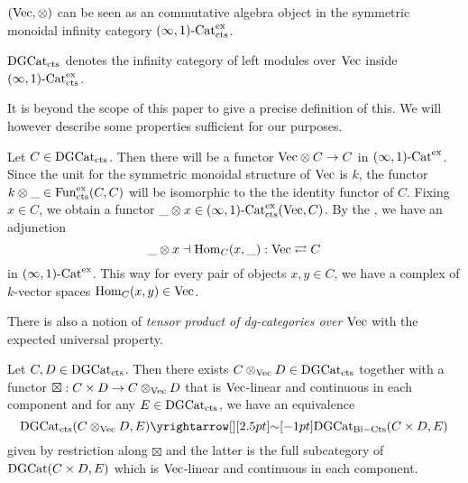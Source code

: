 \documentclass[./main.tex]{subfiles}
\begin{document}


$(\mathrm{Vec},\otimes)$ can be seen as an commutative algebra object in 
the symmetric monoidal infinity category $(\infty,1)\text{-}\mathrm{Cat}^{\mathrm{ex}}_{\mathrm{cts}}$.
\begin{dfn}
  $\mathrm{DGCat}_{\mathrm{cts}}$ denotes the infinity category of 
  left modules over $\mathrm{Vec}$ inside $(\infty,1)\text{-}\mathrm{Cat}^{\mathrm{ex}}_{\mathrm{cts}}$.

  \cite[Ch 1, 3.4, 10.3.3,]{GR1}
\end{dfn} 
It is beyond the scope of this paper to give a precise definition of this.
We will however describe some properties sufficient for our purposes.

Let $C \in \mathrm{DGCat}_{\mathrm{cts}}$.
Then there will be a functor $\mathrm{Vec} \otimes C \to C$ in 
$(\infty,1)\text{-}\mathrm{Cat}^{\mathrm{ex}}$.
Since the unit for the symmetric monoidal structure of $\mathrm{Vec}$ is $k$,
the functor $k \otimes \_ \in \mathrm{Fun}^{\mathrm{ex}}_{\mathrm{cts}}(C , C)$
will be isomorphic to the the identity functor of $C$.
Fixing $x \in C$, we obtain a functor 
$\_ \otimes x \in (\infty,1)\text{-}\mathrm{Cat}^{\mathrm{ex}}_{\mathrm{cts}}(\mathrm{Vec} , C)$.
By the ,
we have an adjunction \[
  \_ \otimes x \dashv \mathrm{Hom}_C(x , \_) : 
  \mathrm{Vec} \rightleftarrows C
\]
in $(\infty,1)\text{-}\mathrm{Cat}^{\mathrm{ex}}$.
This way for every pair of objects $x , y \in C$,
we have a complex of $k$-vector spaces $\mathrm{Hom}_C(x,y) \in \mathrm{Vec}$.

There is also a notion of \emph{tensor product of dg-categories over $\mathrm{Vec}$} 
with the expected universal property.
\begin{prop}
  
  Let $C, D \in \mathrm{DGCat}_{\mathrm{cts}}$.
  Then there exists $C \otimes_{\mathrm{Vec}} D \in \mathrm{DGCat}_{\mathrm{cts}}$ together with
  a functor $\boxtimes : C \times D \to C \otimes_{\mathrm{Vec}} D$
  that is $\mathrm{Vec}$-linear and continuous in each component and
  for any $E \in \mathrm{DGCat}_{\mathrm{cts}}$, we have an equivalence
  \[
    \DGCAT_\CTS(C \otimes_\VEC D , E) \map{\sim}{}
    \DGCAT_{\mathrm{Bi-Cts}}(C \times D , E)
  \]
  given by restriction along $\boxtimes$ and the latter is
  the full subcategory of $\mathrm{DGCat}(C \times D, E)$
  which is $\mathrm{Vec}$-linear and continuous in each component.
  \cite[Ch 1, 10.4]{GR1}
\end{prop}




\end{document}
